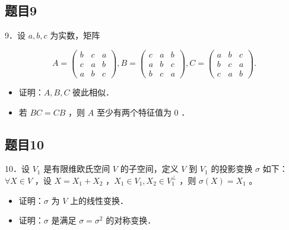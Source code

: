 \documentclass{article}
\begin{document}
\subsection{题目9}
9．设 \(a, b, c\) 为实数，矩阵

\[
A=\left(\begin{array}{lll}
b & c & a \\
c & a & b \\
a & b & c
\end{array}\right), B=\left(\begin{array}{lll}
c & a & b \\
a & b & c \\
b & c & a
\end{array}\right), C=\left(\begin{array}{lll}
a & b & c \\
b & c & a \\
c & a & b
\end{array}\right) .
\]

\begin{itemize}
  \item[（1）] 证明：\(A, B, C\) 彼此相似．
  \item[（2）] 若 \(B C=C B\) ，则 \(A\) 至少有两个特征值为 0 ．
\end{itemize}

\subsection{题目10}
10．设 \(V_{1}\) 是有限维欧氏空间 \(V\) 的子空间，定义 \(V\) 到 \(V_{1}\) 的投影变换 \(\sigma\) 如下：\(\forall X \in V\) ，设 \(X=X_{1}+X_{2}\) ，\(X_{1} \in V_{1}, X_{2} \in V_{1}^{\perp}\) ，则 \(\sigma(X)=X_{1}\) 。

\begin{itemize}
  \item[（1）] 证明：\(\sigma\) 为 \(V\) 上的线性变换．
  \item[（2）] 证明：\(\sigma\) 是满足 \(\sigma=\sigma^{2}\) 的对称变换．
\end{itemize}
\end{document}
